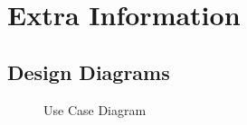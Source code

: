 \chapter{Extra Information}

\section{Design Diagrams}
\begin{figure}
	\caption{Use Case Diagram}
\label{fig:useCase}
\end{figure}
